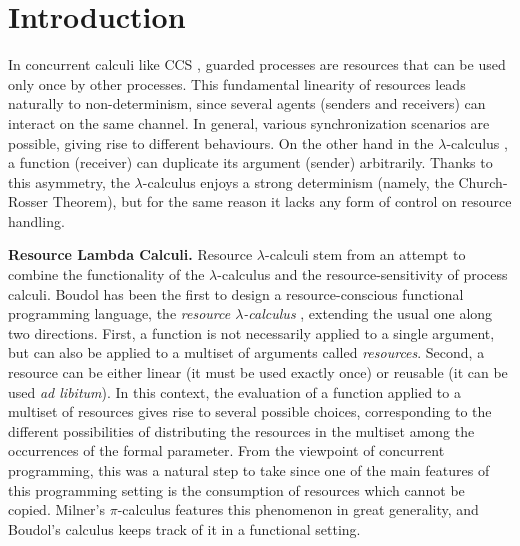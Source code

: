 \documentclass{LMCS}
\begin{document}
\maketitle


\section{Introduction}


In concurrent calculi like CCS \cite{Milner80}, guarded processes are resources
that can be used only once by other processes. This fundamental 
linearity of resources leads naturally to non-determinism,
since several agents  (senders and receivers) 
can interact on the same channel. In general, 
various synchronization scenarios are possible, giving  rise to 
different behaviours. On the other hand in the $\lambda$-calculus \cite{Bare}, a
function (receiver) can duplicate its argument (sender) arbitrarily. 
Thanks to this asymmetry, the $\lambda$-calculus enjoys a
strong determinism (namely, the Church-Rosser Theorem), but for the same reason it 
lacks any form of control on resource handling. 
\medskip

{\bf Resource Lambda Calculi.} Resource $\lambda$-calculi stem from an attempt to combine 
the functionality of the $\lambda$-calculus and 
the resource-sensitivity of process calculi.
Boudol has been the first to design a resource-conscious functional programming language, 
the \emph{resource $\lambda$-calculus}  \cite{Boudol93}, extending the usual one 
along two directions. 
First, a function is not necessarily applied to a single argument, but can also be
applied to a multiset of arguments called \emph{resources}.
Second, a resource can be either linear (it must be used exactly once) or reusable (it can be used \emph{ad libitum}). 
In this context, the evaluation of a function applied to a multiset of resources gives rise to several possible choices, 
corresponding to the different possibilities of distributing the resources in the multiset among the occurrences of the formal parameter.
From the viewpoint of concurrent programming, this  was a natural step to take since one
of the main features of this programming setting is the consumption of
resources which cannot be copied. Milner's
$\pi$-calculus \cite{Milner93} features this phenomenon in great generality, and Boudol's
calculus keeps track of it in a functional setting.
\end{document}

